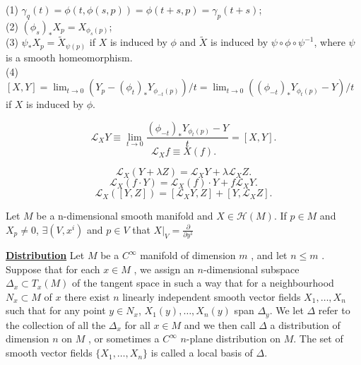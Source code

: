\begin{newprop}
(1) $\gamma_q(t) = \phi(t,\phi(s,p)) = \phi(t+s,p) = \gamma_p(t+s)$;\\
(2) $(\phi_s)_{*}X_p = X_{\phi_s(p)}$;\\
(3) $\psi_{*} X_p = \tilde{X}_{\psi(p)}$ if $X$ is induced by $\phi$ and $\tilde{X}$ is induced by $\psi \circ \phi \circ \psi^{-1} $, where $\psi$ is a smooth  homeomorphism.\\
(4) $[X,Y] = \lim_{t \to 0} ({Y_p-(\phi_t)_* Y_{\phi_{-t}(p)}})/{t} = \lim_{t \to 0} ({(\phi_{-t})_*Y_{\phi_t(p)}- Y})/{t}$ if $X$ is induced by $\phi$.
\end{newprop}

\begin{newdef}
\[\mathcal{L}_{X}Y \equiv \lim_{t \to 0} \frac{(\phi_{-t})_*Y_{\phi_t(p)}- Y}{t} =[X,Y].\]
\[\mathcal{L}_{X}f \equiv X(f).\]
\end{newdef}

\begin{newprop}
\[\mathcal{L}_{X}(Y + \lambda Z) = \mathcal{L}_{X}Y + \lambda\mathcal{L}_{X}Z.\]
\[\mathcal{L}_{X}(f \cdot Y) = \mathcal{L}_{X}(f) \cdot Y + f\mathcal{L}_{X}Y.\]
\[\mathcal{L}_{X}([Y,Z]) = [\mathcal{L}_{X}Y,Z]+ [Y,\mathcal{L}_{X}Z].\]
\end{newprop}

\begin{newthem}
Let $M$ be a n-dimensional smooth manifold and $X \in \mathcal{H}(M)$. If $p \in M$ and $X_p \neq 0$, $\exists (V,x^i)$ and $p \in V$ that $X|_V = \frac{\partial}{\partial y^1 }$
\end{newthem}

\begin{newdef}[Distribution]
\href{https://en.wikipedia.org/wiki/Distribution_(differential_geometry)}{\textbf{Distribution}} Let $M$ be a $C^{\infty }$  manifold of dimension $m$ , and let $n \leq m$ . Suppose that for each $x\in M$ , we assign an $n$-dimensional subspace $\Delta _{x}\subset T_{x}(M)$ of the tangent space in such a way that for a neighbourhood $N_{x}\subset M$ of $x$ there exist $n$ linearly independent smooth vector fields $X_{1},\ldots ,X_{n}$ such that for any point $y\in N_{x}$, $X_{1}(y),\ldots ,X_{n}(y)$ span $\Delta _{y}$. We let $\Delta$  refer to the collection of all the $\Delta_{x}$ for all $ x\in M$ and we then call $\Delta$ a distribution of dimension $n$ on $M$ , or sometimes a $C^{\infty }$ $n$-plane distribution on $M$. The set of smooth vector fields $\{X_{1},\ldots ,X_{n}\}$ is called a local basis of $\Delta$.
\end{newdef}


